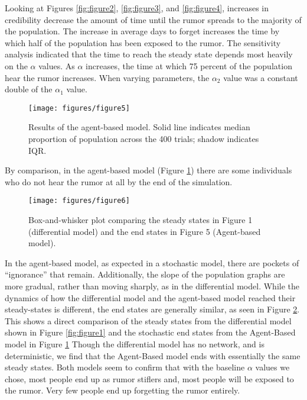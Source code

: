 Looking at Figures \ref{fig:figure2}, \ref{fig:figure3}, and \ref{fig:figure4}, increases in credibility decrease the amount of time until the rumor spreads to the majority of the population. The increase in average days to forget increases the time by which half of the population has been exposed to the rumor. The sensitivity analysis indicated that the time to reach the steady state depends most heavily on the $\alpha$ values. As $ \alpha $ increases, the time at which 75 percent of the population hear the rumor increases. When varying parameters, the $ \alpha_2 $ value was a constant double of the $ \alpha_1 $ value.

\begin{figure}[H]
\captionsetup{width=0.8\textwidth}
\centering
    \texttt{[image: figures/figure5]}
  \caption{ Results of the agent-based model. Solid line indicates median proportion of population across the 400 trials; shadow indicates IQR. }
  \label{fig:figure5}
\end{figure}

By comparison, in the agent-based model (Figure \ref{fig:figure5}) there are some individuals who do not hear the rumor at all by the end of the simulation.

\begin{figure}[H]
\captionsetup{width=0.8\textwidth}
\centering
    \texttt{[image: figures/figure6]}
  \caption{ Box-and-whisker plot comparing the steady states in Figure 1 (differential model) and the end states in Figure 5 (Agent-based model). }
  \label{fig:figure6}
\end{figure}

In the agent-based model, as expected in a stochastic model, there are pockets of ``ignorance'' that remain. Additionally, the slope of the population graphs are more gradual, rather than moving sharply, as in the differential model. While the dynamics of how the differential model and the agent-based model reached their steady-states is  different, the end states are generally similar, as seen in Figure \ref{fig:figure6}. This shows a direct comparison of the steady states from the differential model shown in Figure \ref{fig:figure1} and the stochastic end states from the Agent-Based model in Figure \ref{fig:figure5}  Though the differential model has no network, and is deterministic, we find that the Agent-Based model ends with essentially the same steady states. Both models seem to confirm that with the baseline $\alpha$ values we chose, most people end up as rumor stiflers and, most people will be exposed to the rumor. Very few people end up forgetting the rumor entirely.

